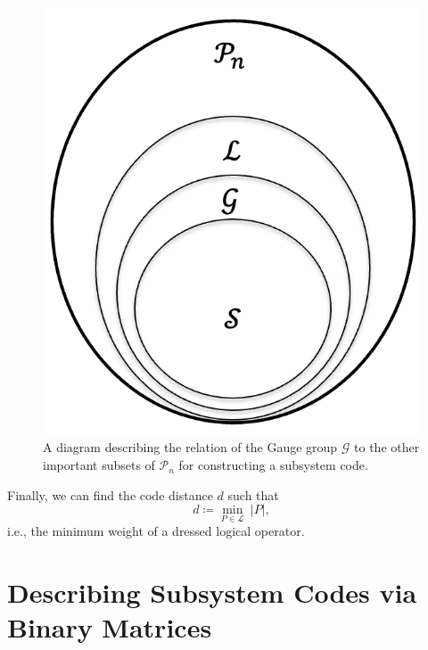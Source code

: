 \documentclass[conference]{IEEEtran}
\begin{document}
\begin{figure}[h]
 \includegraphics[scale=0.3]{vennd.png}
\centering
\caption{A diagram describing the relation of the Gauge group $\mathcal{G}$ to the other important subsets of $\mathcal{P}_{n}$ for constructing a subsystem code.}
\end{figure}



Finally, we can find the code distance $d$ such that 
\begin{equation}
    d \coloneqq \underset{P \in \mathcal{L}}{\min}\ |P|,
\end{equation} 
i.e., the minimum weight of a dressed logical operator.



\section{Describing Subsystem Codes via Binary Matrices}
\end{document}
